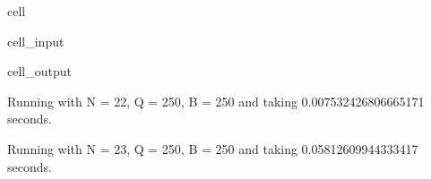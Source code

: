 \documentclass[letterpaper,10pt,english]{jupyterBook}
\begin{document}
\begin{sphinxuseclass}{cell}\begin{sphinxVerbatimInput}

\begin{sphinxuseclass}{cell_input}
\begin{sphinxVerbatim}[commandchars=\\\{\}]
    
    
    
    
\end{sphinxVerbatim}

\end{sphinxuseclass}\end{sphinxVerbatimInput}
\begin{sphinxVerbatimOutput}

\begin{sphinxuseclass}{cell_output}
\begin{sphinxVerbatim}[commandchars=\\\{\}]
Running with N = 2\PYGZca{}2, Q = 2\PYGZca{}50, B = 2\PYGZca{}50 and taking 0.007532426806665171 seconds.
\end{sphinxVerbatim}

\begin{sphinxVerbatim}[commandchars=\\\{\}]
Running with N = 2\PYGZca{}3, Q = 2\PYGZca{}50, B = 2\PYGZca{}50 and taking 0.05812609944333417 seconds.
\end{sphinxVerbatim}


\end{sphinxuseclass}
\end{sphinxVerbatimOutput}
\end{sphinxuseclass}
\end{document}
